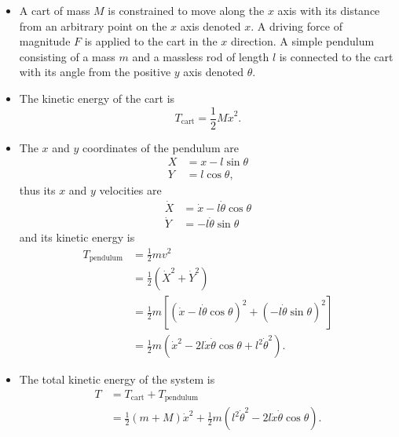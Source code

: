 \documentclass{article}
\begin{document}
\begin{itemize}
  \item A cart of mass $M$ is constrained to move along the $x$ axis with its distance from an arbitrary point on the $x$ axis denoted $x$. A driving force of magnitude $F$ is applied to the cart in the $x$ direction. A simple pendulum consisting of a mass $m$ and a massless rod of length $l$ is connected to the cart with its angle from the positive $y$ axis denoted $\theta$.

  \item The kinetic energy of the cart is \[T_\text{cart} = \frac{1}{2} M \dot{x}^2.\]

  \item The $x$ and $y$ coordinates of the pendulum are \begin{align*}
          X & = x - l \sin \theta \\
          Y & = l \cos \theta,
        \end{align*} thus its $x$ and $y$ velocities are \begin{align*}
          \dot{X} & = \dot{x} - l \dot{\theta} \cos \theta \\
          \dot{Y} & = -l \dot{\theta} \sin \theta
        \end{align*} and its kinetic energy is \begin{align*}
          T_\text{pendulum} & = \frac{1}{2} m v^2                                                                          \\
                            & = \frac{1}{2} (\dot{X}^2 + \dot{Y}^2)                                                        \\
                            & = \frac{1}{2} m [(\dot{x} - l \dot{\theta} \cos \theta)^2 + (-l \dot{\theta} \sin \theta)^2] \\
                            & = \frac{1}{2} m (\dot{x}^2 - 2 l \dot{x} \dot{\theta} \cos \theta + l^2 \dot{\theta}^2).
        \end{align*}

  \item The total kinetic energy of the system is \begin{align*}
          T & = T_\text{cart} + T_\text{pendulum}                                                                          \\
            & = \frac{1}{2} (m + M) \dot{x}^2 + \frac{1}{2} m (l^2 \dot{\theta}^2 - 2 l \dot{x} \dot{\theta} \cos \theta).
        \end{align*}


\end{itemize}
\end{document}
